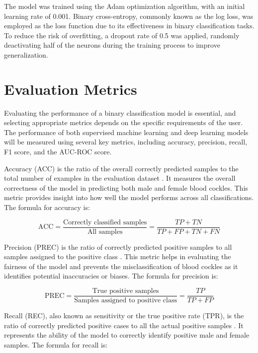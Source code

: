 The model was trained using the Adam optimization algorithm, with an initial learning rate of 0.001. Binary cross-entropy, commonly known as the log loss, was employed as the loss function due to its effectiveness in binary classification tasks. To reduce the risk of overfitting, a dropout rate of 0.5 was applied, randomly deactivating half of the neurons during the training process to improve generalization.

\section{Evaluation Metrics}
Evaluating the performance of a binary classification model is essential, and selecting appropriate metrics depends on the specific requirements of the user. The performance of both supervised machine learning and deep learning models will be measured using several key metrics, including accuracy, precision, recall, F1 score, and the AUC-ROC score.

Accuracy (ACC) is the ratio of the overall correctly predicted samples to the total number of examples in the evaluation dataset \cite{cui2020}. It measures the overall correctness of the model in predicting both male and female blood cockles. This metric provides insight into how well the model performs across all classifications. The formula for accuracy is: 

\begin{equation}
	\text{ACC} = \frac{\text{Correctly classified samples}}{\text{All samples}} = \frac{TP + TN}{TP + FP + TN + FN}
	\label{eq:acc}
\end{equation}

Precision (PREC) is the ratio of correctly predicted positive samples to all samples assigned to the positive class \cite{cui2020}. This metric helps in evaluating the fairness of the model and prevents the misclassification of blood cockles as it identifies potential inaccuracies or biases. The formula for precision is:

\begin{equation}
	\text{PREC} = \frac{\text{True positive samples}}{\text{Samples assigned to positive class}} = \frac{TP}{TP + FP}
	\label{eq:prec}
\end{equation}

Recall (REC), also known as sensitivity or the true positive rate (TPR), is the ratio of correctly predicted positive cases to all the actual positive samples \cite{cui2020}. It represents the ability of the model to correctly identify positive male and female samples. The formula for recall is:

